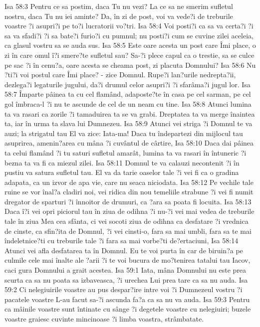 Isa 58:3  Pentru ce sa postim, daca Tu nu vezi? La ce sa ne smerim sufletul nostru, daca Tu nu iei aminte? Da, în zi de post, voi va vede?i de treburile voastre ?i asupri?i pe to?i lucratorii vo?tri.
Isa 58:4  Voi posti?i ca sa va certa?i ?i sa va sfadi?i ?i sa bate?i furio?i cu pumnul; nu posti?i cum se cuvine zilei aceleia, ca glasul vostru sa se auda sus.
Isa 58:5  Este oare acesta un post care Îmi place, o zi în care omul î?i smere?te sufletul sau? Sa-?i plece capul ca o trestie, sa se culce pe sac ?i în cenu?a, oare acesta se cheama post, zi placuta Domnului?
Isa 58:6  Nu ?ti?i voi postul care Îmi place? - zice Domnul. Rupe?i lan?urile nedrepta?ii, dezlega?i legaturile jugului, da?i drumul celor asupri?i ?i sfarâma?i jugul lor.
Isa 58:7  Împarte pâinea ta cu cel flamând, adaposte?te în casa pe cel sarman, pe cel gol îmbraca-l ?i nu te ascunde de cel de un neam cu tine.
Isa 58:8  Atunci lumina ta va rasari ca zorile ?i tamaduirea ta se va grabi. Dreptatea ta va merge înaintea ta, iar în urma ta slava lui Dumnezeu.
Isa 58:9  Atunci vei striga ?i Domnul te va auzi; la strigatul tau El va zice: Iata-ma! Daca tu îndepartezi din mijlocul tau asuprirea, amenin?area cu mâna ?i cuvântul de cârtire,
Isa 58:10  Daca dai pâinea ta celui flamând ?i tu saturi sufletul amarât, lumina ta va rasari în întuneric ?i bezna ta va fi ca miezul zilei.
Isa 58:11  Domnul te va calauzi necontenit ?i în pustiu va satura sufletul tau. El va da tarie oaselor tale ?i vei fi ca o gradina adapata, ca un izvor de apa vie, care nu seaca niciodata.
Isa 58:12  Pe vechile tale ruine se vor înal?a cladiri noi, vei ridica din nou temeliile strabune ?i vei fi numit dregator de sparturi ?i înnoitor de drumuri, ca ?ara sa poata fi locuita.
Isa 58:13  Daca î?i vei opri piciorul tau în ziua de odihna ?i nu-?i vei mai vedea de treburile tale în ziua Mea cea sfânta, ci vei socoti ziua de odihna ca desfatare ?i vrednica de cinste, ca sfin?ita de Domnul, ?i vei cinsti-o, fara sa mai umbli, fara sa te mai îndeletnice?ti cu treburile tale ?i fara sa mai vorbe?ti de?ertaciuni,
Isa 58:14  Atunci vei afla desfatarea ta în Domnul. Eu te voi purta în car de biruin?a pe culmile cele mai înalte ale ?arii ?i te voi bucura de mo?tenirea tatalui tau Iacov, caci gura Domnului a grait acestea.
Isa 59:1  Iata, mâna Domnului nu este prea scurta ca sa nu poata sa izbaveasca, ?i urechea Lui prea tare ca sa nu auda.
Isa 59:2  Ci nelegiuirile voastre au pus despar?ire intre voi ?i Dumnezeul vostru ?i pacatele voastre L-au facut sa-?i ascunda fa?a ca sa nu va auda.
Isa 59:3  Pentru ca mâinile voastre sunt întinate cu sânge ?i degetele voastre cu nelegiuiri; buzele voastre graiesc cuvinte mincinoase ?i limba voastra, strâmbatate.
